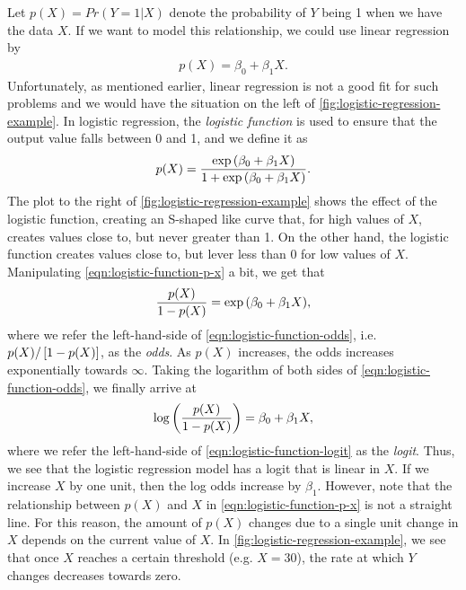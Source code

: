 Let $p(X) = Pr(Y = 1|X)$ denote the probability of $Y$ being 1 when we have the data $X$. If we want to model this relationship, we could use linear regression by
\begin{align}
    p(X) = \beta_0 + \beta_1 X.
\end{align}
Unfortunately, as mentioned earlier, linear regression is not a good fit for such problems and we would have the situation on the left of \cref{fig:logistic-regression-example}. In logistic regression, the \textit{logistic function} is used to ensure that the output value falls between 0 and 1, and we define it as
\begin{align}
    p(X) = \frac{\exp{\left(\beta_0 + \beta_1 X\right)}}{1 + \exp{\left(\beta_0 + \beta_1 X\right)}}.
    \label{eqn:logistic-function-p-x}
\end{align}
The plot to the right of \cref{fig:logistic-regression-example} shows the effect of the logistic function, creating an S-shaped like curve that, for high values of $X$, creates values close to, but never greater than 1. On the other hand, the logistic function creates values close to, but lever less than 0 for low values of $X$. Manipulating \cref{eqn:logistic-function-p-x} a bit, we get that
\begin{align}
    \frac{p(X)}{1 - p(X)} = \exp{\left(\beta_0 + \beta_1 X\right)},
    \label{eqn:logistic-function-odds}
\end{align}
where we refer the left-hand-side of \cref{eqn:logistic-function-odds}, i.e. $p(X)/\left[1 - p(X)\right]$, as the \textit{odds}. As $p(X)$ increases, the odds increases exponentially towards $\infty$. Taking the logarithm of both sides of \cref{eqn:logistic-function-odds}, we finally arrive at
\begin{align}
    \log \left(\frac{p(X)}{1 - p(X)}\right) = \beta_0 + \beta_1 X,
    \label{eqn:logistic-function-logit}
\end{align}
where we refer the left-hand-side of \cref{eqn:logistic-function-logit} as the \textit{logit}. Thus, we see that the logistic regression model has a logit that is linear in $X$. If we increase $X$ by one unit, then the log odds increase by $\beta_1$. However, note that the relationship between $p(X)$ and $X$ in \cref{eqn:logistic-function-p-x} is not a straight line. For this reason, the amount of $p(X)$ changes due to a single unit change in $X$ depends on the current value of $X$. In \cref{fig:logistic-regression-example}, we see that once $X$ reaches a certain threshold (e.g. $X=30$), the rate at which $Y$ changes decreases towards zero.

